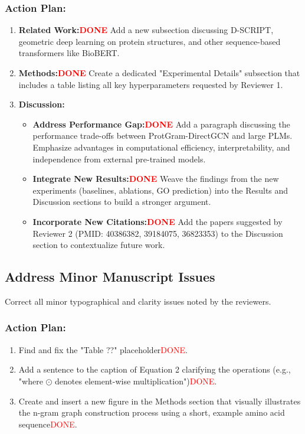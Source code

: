 \documentclass[11pt, a4paper]{article}
\begin{document}
	\subsubsection*{Action Plan:}
	\begin{enumerate}
		\item \textbf{Related Work:\textcolor{red}{DONE}} Add a new subsection discussing D-SCRIPT, geometric deep learning on protein structures, and other sequence-based transformers like BioBERT.
		\item \textbf{Methods:\textcolor{red}{DONE}} Create a dedicated "Experimental Details" subsection that includes a table listing all key hyperparameters requested by Reviewer 1.
		\item \textbf{Discussion:}
		\begin{itemize}
			\item \textbf{Address Performance Gap:\textcolor{red}{DONE}} Add a paragraph discussing the performance trade-offs between ProtGram-DirectGCN and large PLMs. Emphasize advantages in computational efficiency, interpretability, and independence from external pre-trained models.
			\item \textbf{Integrate New Results:\textcolor{red}{DONE}} Weave the findings from the new experiments (baselines, ablations, GO prediction) into the Results and Discussion sections to build a stronger argument.
			\item \textbf{Incorporate New Citations:\textcolor{red}{DONE}} Add the papers suggested by Reviewer 2 (PMID: 40386382, 39184075, 36823353) to the Discussion section to contextualize future work.
		\end{itemize}
	\end{enumerate}
	
	\subsection{Address Minor Manuscript Issues}
	Correct all minor typographical and clarity issues noted by the reviewers.
	\subsubsection*{Action Plan:}
	\begin{enumerate}
		\item Find and fix the "Table ??" placeholder\textcolor{red}{DONE}.
		\item Add a sentence to the caption of Equation 2 clarifying the operations (e.g., "where $\odot$ denotes element-wise multiplication")\textcolor{red}{DONE}.
		\item Create and insert a new figure in the Methods section that visually illustrates the n-gram graph construction process using a short, example amino acid sequence\textcolor{red}{DONE}.
	\end{enumerate}
	
\end{document}
